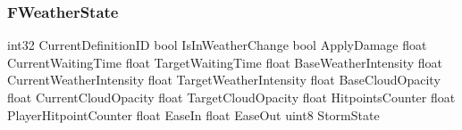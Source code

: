 \subsubsection{FWeatherState}
\begin{code}
int32                                       CurrentDefinitionID
bool                                        IsInWeatherChange
bool                                        ApplyDamage
float                                       CurrentWaitingTime
float                                       TargetWaitingTime
float                                       BaseWeatherIntensity
float                                       CurrentWeatherIntensity
float                                       TargetWeatherIntensity
float                                       BaseCloudOpacity
float                                       CurrentCloudOpacity
float                                       TargetCloudOpacity
float                                       HitpointsCounter
float                                       PlayerHitpointCounter
float                                       EaseIn
float                                       EaseOut
uint8                                       StormState
\end{code}